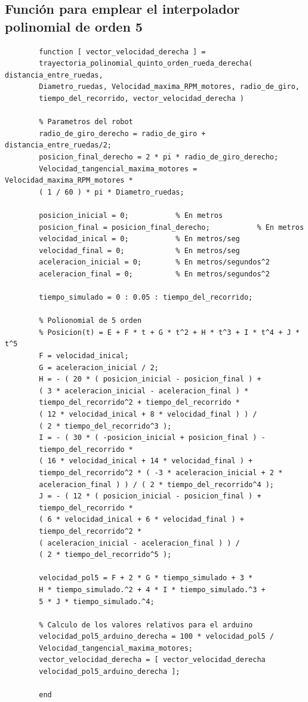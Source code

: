 \documentclass[12pt,a4paper]{article}
\begin{document}
        
        \subsection{Función para emplear el interpolador polinomial de orden 5}
        
        \begin{verbatim}
        function [ vector_velocidad_derecha ] =
        trayectoria_polinomial_quinto_orden_rueda_derecha( distancia_entre_ruedas,
        Diametro_ruedas, Velocidad_maxima_RPM_motores, radio_de_giro,
        tiempo_del_recorrido, vector_velocidad_derecha )

        % Parametros del robot
        radio_de_giro_derecho = radio_de_giro + distancia_entre_ruedas/2;
        posicion_final_derecho = 2 * pi * radio_de_giro_derecho;
        Velocidad_tangencial_maxima_motores = Velocidad_maxima_RPM_motores *
        ( 1 / 60 ) * pi * Diametro_ruedas;

        posicion_inicial = 0;           % En metros
        posicion_final = posicion_final_derecho;           % En metros
        velocidad_inical = 0;           % En metros/seg
        velocidad_final = 0;            % En metros/seg
        aceleracion_inicial = 0;        % En metros/segundos^2
        aceleracion_final = 0;          % En metros/segundos^2

        tiempo_simulado = 0 : 0.05 : tiempo_del_recorrido;

        % Polionomial de 5 orden
        % Posicion(t) = E + F * t + G * t^2 + H * t^3 + I * t^4 + J * t^5
        F = velocidad_inical;
        G = aceleracion_inicial / 2;
        H = - ( 20 * ( posicion_inicial - posicion_final ) +
        ( 3 * aceleracion_inicial - aceleracion_final ) *
        tiempo_del_recorrido^2 + tiempo_del_recorrido *
        ( 12 * velocidad_inical + 8 * velocidad_final ) ) /
        ( 2 * tiempo_del_recorrido^3 );
        I = - ( 30 * ( -posicion_inicial + posicion_final ) -
        tiempo_del_recorrido *
        ( 16 * velocidad_inical + 14 * velocidad_final ) +
        tiempo_del_recorrido^2 * ( -3 * aceleracion_inicial + 2 *
        aceleracion_final ) ) / ( 2 * tiempo_del_recorrido^4 );
        J = - ( 12 * ( posicion_inicial - posicion_final ) +
        tiempo_del_recorrido *
        ( 6 * velocidad_inical + 6 * velocidad_final ) +
        tiempo_del_recorrido^2 *
        ( aceleracion_inicial - aceleracion_final ) ) /
        ( 2 * tiempo_del_recorrido^5 );
        
        velocidad_pol5 = F + 2 * G * tiempo_simulado + 3 *
        H * tiempo_simulado.^2 + 4 * I * tiempo_simulado.^3 +
        5 * J * tiempo_simulado.^4;

        % Calculo de los valores relativos para el arduino
        velocidad_pol5_arduino_derecha = 100 * velocidad_pol5 /
        Velocidad_tangencial_maxima_motores;
        vector_velocidad_derecha = [ vector_velocidad_derecha
        velocidad_pol5_arduino_derecha ];

        end
        \end{verbatim}
        
\end{document}
